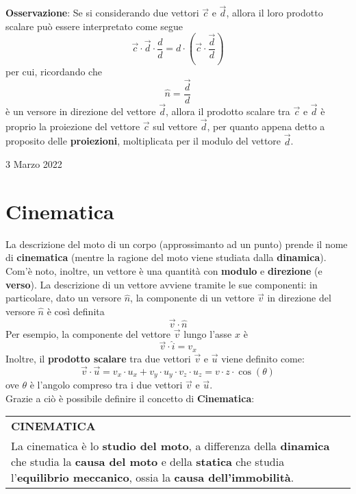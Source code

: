 \documentclass[a4paper]{extarticle}
\renewcommand\arraystretch{}
\begin{document}
\vspace{1em}
\noindent
\textbf{Osservazione}: Se si considerando due vettori $\vec{c}$ e $\vec{d}$, allora il loro prodotto scalare può essere interpretato come segue
\[\vec{c} \cdot \vec{d} \cdot \frac{d}{d} = d \cdot \left(\vec{c} \cdot \frac{\vec{d}}{d}\right)\]
per cui, ricordando che
\[\hat{n} = \frac{\vec{d}}{d}\]
è un versore in direzione del vettore $\vec{d}$, allora il prodotto scalare tra $\vec{c}$ e $\vec{d}$ è proprio la proiezione del vettore $\vec{c}$ sul vettore $\vec{d}$, per quanto appena detto a proposito delle \textbf{proiezioni}, moltiplicata per il modulo del vettore $\vec{d}$.

\newpage
\noindent
\begin{center}
  3 Marzo 2022
\end{center}

\section{Cinematica}
La descrizione del moto di un corpo (approssimanto ad un punto) prende il nome di \textbf{cinematica} (mentre la ragione del moto viene studiata dalla \textbf{dinamica}). Com'è noto, inoltre, un vettore è una quantità con \textbf{modulo} e \textbf{direzione} (e \textbf{verso}). La descrizione di un vettore avviene tramite le sue componenti: in particolare, dato un versore $\hat{n}$, la componente di un vettore $\vec{v}$ in direzione del versore $\hat{n}$ è così definita
\[\vec{v} \cdot \hat{n}\]
Per esempio, la componente del vettore $\vec{v}$ lungo l'asse $x$ è
\[\vec{v} \cdot \hat{i} = v_x\]
Inoltre, il \textbf{prodotto scalare} tra due vettori $\vec{v}$ e $\vec{u}$ viene definito come:
\[\vec{v} \cdot \vec{u} = v_x \cdot u_x + v_y \cdot u_y \cdot v_z \cdot u_z = v \cdot z \cdot \cos(\theta)\]
ove $\theta$ è l'angolo compreso tra i due vettori $\vec{v}$ e $\vec{u}$.\\
Grazie a ciò è possibile definire il concetto di \textbf{Cinematica}:

\vspace{1em}
\setlength{\tabcolsep}{14pt}
\renewcommand{\arraystretch}{2}
\noindent
\begin{tabularx}{\textwidth}{@{}|P|@{}}
    \hline
    {\textbf{CINEMATICA}}\\
    \parbox{\linewidth}{La cinematica è lo \textbf{studio del moto}, a differenza della \textbf{dinamica} che studia la \textbf{causa del moto} e della \textbf{statica} che studia l'\textbf{equilibrio meccanico}, ossia la \textbf{causa dell'immobilità}.
    \vspace{3mm}}\\
    \hline
\end{tabularx}
\end{document}
